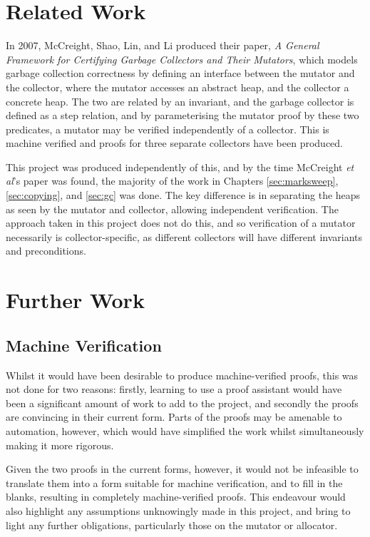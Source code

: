\section{Related Work}
\label{sec:conclusion-related}

In 2007, McCreight, Shao, Lin, and Li produced their paper, \textit{A
  General Framework for Certifying Garbage Collectors and Their
  Mutators}\cite{McCreight07}, which models garbage collection
correctness by defining an interface between the mutator and the
collector, where the mutator accesses an abstract heap, and the
collector a concrete heap. The two are related by an invariant, and
the garbage collector is defined as a step relation, and by
parameterising the mutator proof by these two predicates, a mutator
may be verified independently of a collector. This is machine
verified and proofs for three separate collectors have been
produced.

This project was produced independently of this, and by the time
McCreight \textit{et al}'s paper was found, the majority of the work in
Chapters \ref{sec:marksweep}, \ref{sec:copying}, and \ref{sec:gc} was
done. The key difference is in separating the heaps as seen by the
mutator and collector, allowing independent verification. The approach
taken in this project does not do this, and so verification of a
mutator necessarily is collector-specific, as different collectors
will have different invariants and preconditions.

\section{Further Work}
\label{sec:conclusion-further}

\subsection{Machine Verification}
\label{sec:conclusion-further-machineverification}

Whilst it would have been desirable to produce machine-verified
proofs, this was not done for two reasons: firstly, learning to use a
proof assistant would have been a significant amount of work to add to
the project, and secondly the proofs are convincing in their current
form. Parts of the proofs may be amenable to automation, however,
which would have simplified the work whilst simultaneously making it
more rigorous.

Given the two proofs in the current forms, however, it would not be
infeasible to translate them into a form suitable for machine
verification, and to fill in the blanks, resulting in completely
machine-verified proofs. This endeavour would also highlight any
assumptions unknowingly made in this project, and bring to light any
further obligations, particularly those on the mutator or allocator.


